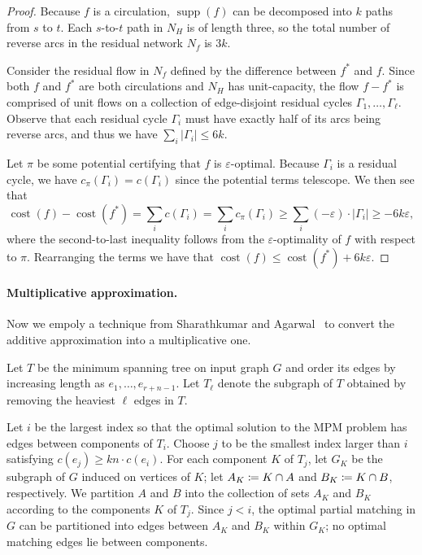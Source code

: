 \documentclass[11pt]{article}
\def\eps{\varepsilon}
\def\cost{\operatorname{cost}}
\def\supp{\operatorname{supp}}
\theoremstyle{plain}
\numberwithin{figure}{section}
\def\EMPH#1{\textbf{\boldmath #1}}
\begin{document}
\begin{proof}
Because $f$ is a circulation, $\supp(f)$ can be decomposed into $k$ paths from
$s$ to $t$.
Each $s$-to-$t$ path in $N_H$ is of length three, so the total number of reverse arcs in the residual network $N_f$ is $3k$.

Consider the residual flow in $N_f$ defined by the difference between $f^*$ and $f$.
Since both $f$ and $f^*$ are both circulations and $N_H$ has unit-capacity,
the flow $f - f^*$ is comprised of unit flows on a collection of edge-disjoint residual cycles $\Gamma_1, \ldots, \Gamma_\ell$.
Observe that each residual cycle $\Gamma_i$ must have exactly half of its arcs being reverse arcs, and thus we have $\sum_i |\Gamma_i| \leq 6k$.

Let $\pi$ be some potential certifying that $f$ is $\eps$-optimal.
Because $\Gamma_i$ is a residual cycle, we have $c_\pi(\Gamma_i) = c(\Gamma_i)$ since the potential terms telescope.
We then see that
\[
	\cost(f) - \cost(f^*)
	= \sum_i c(\Gamma_i)
	= \sum_i c_\pi(\Gamma_i)
	\geq \sum_i (-\eps) \cdot |\Gamma_i|
	\geq -6k\eps,
\]
where the second-to-last inequality follows from the $\eps$-optimality of $f$
with respect to $\pi$.
Rearranging the terms we have that $\cost(f) \leq \cost(f^*) + 6k\eps$.
\end{proof}


\paragraph{Multiplicative approximation.}
Now we empoly a technique from Sharathkumar and Agarwal~\cite{SA12} to convert the additive approximation into a multiplicative one.

Let $T$ be the minimum spanning tree on input graph $G$ and order
its edges by increasing length as $e_1, \ldots, e_{r+n-1}$.
Let $T_\ell$ denote the subgraph of $T$ obtained by removing the heaviest $\ell$ edges in $T$.

Let $i$ be the largest index so that
the optimal solution to the MPM problem has edges between components of $T_i$.
Choose $j$ to be the smallest index larger than $i$ satisfying
$c(e_j) \geq kn \cdot c(e_i)$.
For each component $K$ of $T_j$, let
$G_K$ be the subgraph of $G$ induced on vertices of $K$;
let $\EMPH{$A_K$} \coloneqq K \cap A$ and $\EMPH{$B_K$} \coloneqq K \cap B$, respectively.
We partition $A$ and $B$ into the collection of sets $A_K$ and $B_K$ according to the components $K$ of $T_j$.
Since $j < i$, the optimal partial matching in $G$ can be partitioned into edges between $A_K$ and $B_K$ within $G_K$; no optimal matching edges lie between components.
\end{document}
